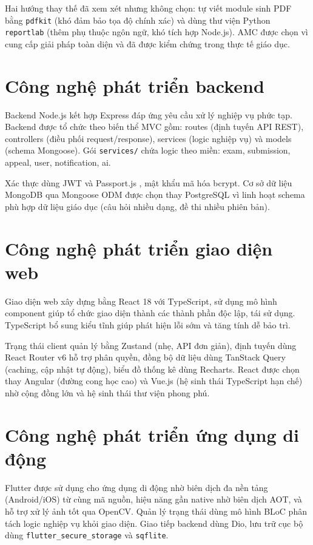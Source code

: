 ﻿\documentclass[../DoAn.tex]{subfiles}
\begin{document}
Hai hướng thay thế đã xem xét nhưng không chọn: tự viết module sinh PDF bằng \texttt{pdfkit} (khó đảm bảo tọa độ chính xác) và dùng thư viện Python \texttt{reportlab} (thêm phụ thuộc ngôn ngữ, khó tích hợp Node.js). AMC được chọn vì cung cấp giải pháp toàn diện và đã được kiểm chứng trong thực tế giáo dục.

\section{Công nghệ phát triển backend}
\label{section:3.3}

Backend Node.js \cite{nodejs} kết hợp Express \cite{expressjs} đáp ứng yêu cầu xử lý nghiệp vụ phức tạp. Backend được tổ chức theo biến thể MVC \cite{mvc} gồm: routes (định tuyến API REST), controllers (điều phối request/response), services (logic nghiệp vụ) và models (schema Mongoose). Gói \texttt{services/} chứa logic theo miền: exam, submission, appeal, user, notification, ai.

Xác thực dùng JWT \cite{rfc7519} và Passport.js \cite{passportjs}, mật khẩu mã hóa bcrypt. Cơ sở dữ liệu MongoDB \cite{mongodb} qua Mongoose ODM \cite{odm} được chọn thay PostgreSQL vì linh hoạt schema phù hợp dữ liệu giáo dục (câu hỏi nhiều dạng, đề thi nhiều phiên bản).

\section{Công nghệ phát triển giao diện web}
\label{section:3.4}

Giao diện web xây dựng bằng React \cite{reactdocs} 18 với TypeScript, sử dụng mô hình component giúp tổ chức giao diện thành các thành phần độc lập, tái sử dụng. TypeScript bổ sung kiểu tĩnh giúp phát hiện lỗi sớm và tăng tính dễ bảo trì.

Trạng thái client quản lý bằng Zustand \cite{zustand} (nhẹ, API đơn giản), định tuyến dùng React Router v6 hỗ trợ phân quyền, đồng bộ dữ liệu dùng TanStack Query (caching, cập nhật tự động), biểu đồ thống kê dùng Recharts. React được chọn thay Angular (đường cong học cao) và Vue.js (hệ sinh thái TypeScript hạn chế) nhờ cộng đồng lớn và hệ sinh thái thư viện phong phú.

\section{Công nghệ phát triển ứng dụng di động}
\label{section:3.5}

Flutter \cite{flutter} được sử dụng cho ứng dụng di động nhờ biên dịch đa nền tảng (Android/iOS) từ cùng mã nguồn, hiệu năng gần native nhờ biên dịch AOT, và hỗ trợ xử lý ảnh tốt qua OpenCV. Quản lý trạng thái dùng mô hình BLoC \cite{bloc} phân tách logic nghiệp vụ khỏi giao diện. Giao tiếp backend dùng Dio, lưu trữ cục bộ dùng \texttt{flutter\_secure\_storage} và \texttt{sqflite}.
\end{document}
